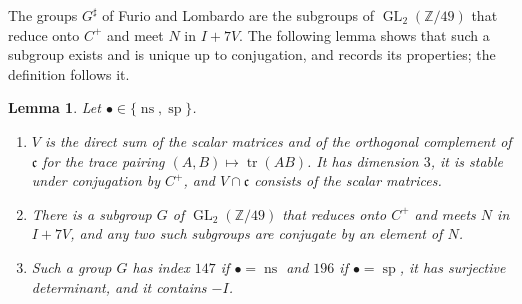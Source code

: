 \documentclass[12pt]{amsart}
\newcommand{\Z}{\mathbb{Z}}
\DeclareMathOperator{\ns}{ns}
\DeclareMathOperator{\spc}{sp}
\newcommand{\GL}{\operatorname{GL}}
\numberwithin{equation}{section}
\newtheorem{lemma}[theorem]{Lemma}
\theoremstyle{definition}
\begin{document}
The groups $G^{\sharp}$ of Furio and Lombardo are the subgroups of
$\GL_2(\Z/49)$ that reduce onto $C^{+}$ and meet $N$ in $I + 7V$. The
following lemma shows that such a subgroup exists and is unique up to
conjugation, and records its properties; the definition follows it.

\begin{lemma}
  \label{lem:groups}
  Let $\bullet \in \{\ns,\spc\}$.
  \begin{enumerate}
  \item \label{item:V} $V$ is the direct sum of the scalar matrices
    and of the orthogonal complement of $\mathfrak{c}$ for the trace
    pairing $(A,B) \mapsto \operatorname{tr}(AB)$. It has dimension $3$, it is
    stable under conjugation by $C^{+}$, and
    $V \cap \mathfrak{c}$ consists of the scalar matrices.
  \item \label{item:G-unique} There is a subgroup $G$ of $\GL_2(\Z/49)$ that
    reduces onto $C^{+}$ and meets $N$ in $I + 7V$, and
    any two such subgroups are conjugate by an element of $N$.
  \item \label{item:G-properties} Such a group $G$ has index $147$ if
    $\bullet = \ns$ and $196$ if $\bullet = \spc$, it has surjective
    determinant, and it contains $-I$.
  \end{enumerate}
\end{lemma}
\end{document}
